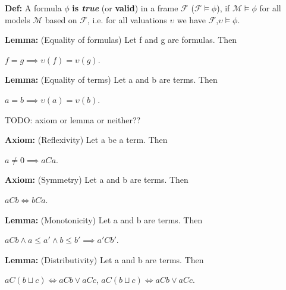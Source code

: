 \documentclass{article}
\newcommand\M{\mathcal{M}}
\newcommand\F{\mathcal{F}}
\newcommand\Def{\noindent \textbf{Def: }}
\newcommand\Lemma{\noindent \textbf{Lemma: }}
\newcommand\Axiom{\noindent \textbf{Axiom: }}
\begin{document}
	\par
	\Def A formula $\phi$ \textbf{is \textit{true}} (or \textbf{valid}) in a frame $\F$ ($\F \models \phi$), if $\M \models \phi$ for all models $\M$ based on $\F$, i.e. for all valuations $\upsilon$ we have $\F$,$\upsilon \models \phi$.\

	\par
	\Lemma (Equality of formulas) Let f and g are formulas. Then \par $f = g \implies \upsilon(f) = \upsilon(g)$.

	\par
	\Lemma (Equality of terms) Let a and b are terms. Then \par $a = b \implies \upsilon(a) = \upsilon(b)$.

	TODO: axiom or lemma or neither??
	\par
	\Axiom (Reflexivity) Let a be a term. Then \par $ a \neq 0 \implies aCa$.

	\par
	\Axiom (Symmetry) Let a and b are terms. Then \par $aCb \iff bCa$.

	\par
	\Lemma (Monotonicity) Let a and b are terms. Then \par $aCb \land a \leq a' \land b \leq b' \implies a'Cb'$.

	\par
	\Lemma (Distributivity) Let a and b are terms. Then \par $aC(b \sqcup c) \iff aCb \lor aCc$, \; $aC(b \sqcup c) \iff aCb \lor aCc$.
\end{document}
